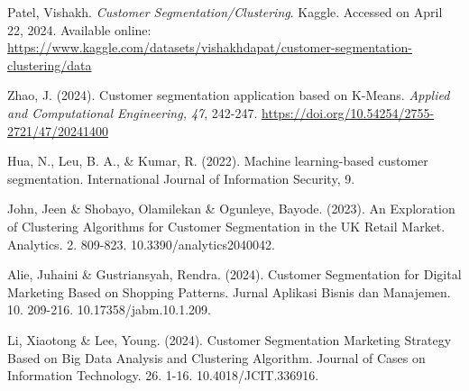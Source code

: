 \documentclass{article}
\begin{document}
\begin{thebibliography}{9}
    Patel, Vishakh. \emph{Customer Segmentation/Clustering}. Kaggle. Accessed on April 22, 2024. Available online: \url{https://www.kaggle.com/datasets/vishakhdapat/customer-segmentation-clustering/data}

    Zhao, J. (2024). Customer segmentation application based on K-Means. \emph{Applied and Computational Engineering, 47}, 242-247. \url{https://doi.org/10.54254/2755-2721/47/20241400}

    Hua, N., Leu, B. A., \& Kumar, R. (2022). Machine learning-based customer segmentation. International Journal of Information Security, 9.

    John, Jeen \& Shobayo, Olamilekan \& Ogunleye, Bayode. (2023). An Exploration of Clustering Algorithms for Customer Segmentation in the UK Retail Market. Analytics. 2. 809-823. 10.3390/analytics2040042. 

    Alie, Juhaini \& Gustriansyah, Rendra. (2024). Customer Segmentation for Digital Marketing Based on Shopping Patterns. Jurnal Aplikasi Bisnis dan Manajemen. 10. 209-216. 10.17358/jabm.10.1.209. 

    Li, Xiaotong \& Lee, Young. (2024). Customer Segmentation Marketing Strategy Based on Big Data Analysis and Clustering Algorithm. Journal of Cases on Information Technology. 26. 1-16. 10.4018/JCIT.336916. 

\end{thebibliography}

\end{document}
